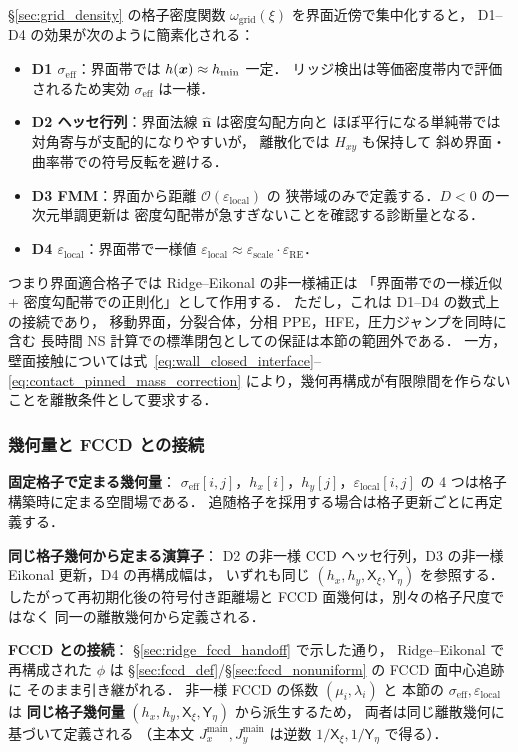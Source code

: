 \S\ref{sec:grid_density} の格子密度関数
$\omega_\text{grid}(\xi)$ を界面近傍で集中化すると，
D1--D4 の効果が次のように簡素化される：
\begin{itemize}
  \item \textbf{D1 $\sigma_\text{eff}$}：界面帯では $h(\bm{x}) \approx h_\text{min}$ 一定．
        リッジ検出は等価密度帯内で評価されるため実効 $\sigma_\text{eff}$ は一様．
  \item \textbf{D2 ヘッセ行列}：界面法線 $\hat{\bm n}$ は密度勾配方向と
        ほぼ平行になる単純帯では対角寄与が支配的になりやすいが，
        離散化では $H_{xy}$ も保持して
        斜め界面・曲率帯での符号反転を避ける．
  \item \textbf{D3 FMM}：界面から距離 $\mathcal{O}(\varepsilon_\text{local})$ の
        狭帯域のみで定義する．$D<0$ の一次元単調更新は
        密度勾配帯が急すぎないことを確認する診断量となる．
  \item \textbf{D4 $\varepsilon_\text{local}$}：界面帯で一様値
        $\varepsilon_\text{local}\approx \varepsilon_\text{scale}\cdot\varepsilon_{\mathrm{RE}}$．
\end{itemize}
つまり界面適合格子では Ridge--Eikonal の非一様補正は
「界面帯での一様近似 + 密度勾配帯での正則化」として作用する．
ただし，これは D1--D4 の数式上の接続であり，
移動界面，分裂合体，分相 PPE，HFE，圧力ジャンプを同時に含む
長時間 NS 計算での標準閉包としての保証は本節の範囲外である．
一方，壁面接触については式~\eqref{eq:wall_closed_interface}--\eqref{eq:contact_pinned_mass_correction}
により，幾何再構成が有限隙間を作らないことを離散条件として要求する．

\subsubsection{幾何量と FCCD との接続}
\label{sec:ridge_nu_cost}

\noindent\textbf{固定格子で定まる幾何量}：
$\sigma_\text{eff}[i,j]$，$h_x[i]$，$h_y[j]$，$\varepsilon_\text{local}[i,j]$ の
4 つは格子構築時に定まる空間場である．
追随格子を採用する場合は格子更新ごとに再定義する．

\noindent\textbf{同じ格子幾何から定まる演算子}：
D2 の非一様 CCD ヘッセ行列，D3 の非一様 Eikonal 更新，D4 の再構成幅は，
いずれも同じ $(h_x,h_y,\mathsf{X}_\xi,\mathsf{Y}_\eta)$ を参照する．
したがって再初期化後の符号付き距離場と FCCD 面幾何は，別々の格子尺度ではなく
同一の離散幾何から定義される．

\noindent\textbf{FCCD との接続}：
\S\ref{sec:ridge_fccd_handoff} で示した通り，
Ridge--Eikonal で再構成された $\phi$ は
\S\ref{sec:fccd_def}/\S\ref{sec:fccd_nonuniform} の FCCD 面中心追跡に
そのまま引き継がれる．
非一様 FCCD の係数 $(\mu_i, \lambda_i)$ と
本節の $\sigma_\text{eff}, \varepsilon_\text{local}$ は
\textbf{同じ格子幾何量} $(h_x, h_y, \mathsf{X}_\xi, \mathsf{Y}_\eta)$ から派生するため，
両者は同じ離散幾何に基づいて定義される
（主本文 $J_x^{\mathrm{main}}, J_y^{\mathrm{main}}$ は逆数 $1/\mathsf{X}_\xi, 1/\mathsf{Y}_\eta$ で得る）．

